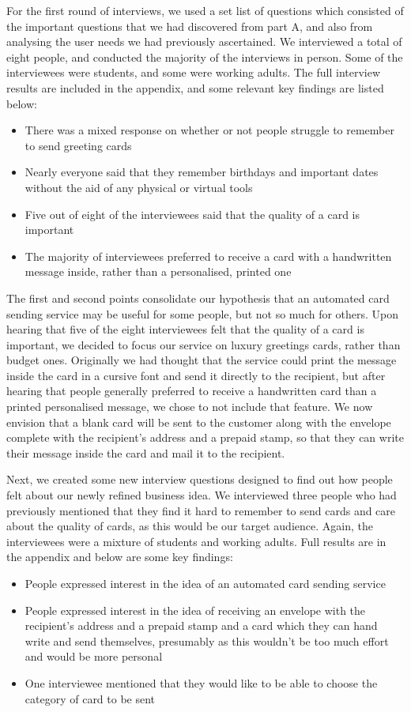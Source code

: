 \documentclass[10pt,a4paper]{article}
\begin{document}
For the first round of interviews, we used a set list of questions which consisted of the important questions that we had discovered from part A, and also from analysing the user needs we had previously ascertained. We interviewed a total of eight people, and conducted the majority of the interviews in person. Some of the interviewees were students, and some were working adults. The full interview results are included in the appendix, and some relevant key findings are listed below:
\begin{itemize}
  \item There was a mixed response on whether or not people struggle to remember to send greeting cards
  \item Nearly everyone said that they remember birthdays and important dates without the aid of any physical or virtual tools
  \item Five out of eight of the interviewees said that the quality of a card is important
  \item The majority of interviewees preferred to receive a card with a handwritten message inside, rather than a personalised, printed one
\end{itemize}
The first and second points consolidate our hypothesis that an automated card sending service may be useful for some people, but not so much for others. Upon hearing that five of the eight interviewees felt that the quality of a card is important, we decided to focus our service on luxury greetings cards, rather than budget ones. Originally we had thought that the service could print the message inside the card in a cursive font and send it directly to the recipient, but after hearing that people generally preferred to receive a handwritten card than a printed personalised message, we chose to not include that feature. We now envision that a blank card will be sent to the customer along with the envelope complete with the recipient's address and a prepaid stamp, so that they can write their message inside the card and mail it to the recipient.

Next, we created some new interview questions designed to find out how people felt about our newly refined business idea. We interviewed three people who had previously mentioned that they find it hard to remember to send cards and care about the quality of cards, as this would be our target audience. Again, the interviewees were a mixture of students and working adults. Full results are in the appendix and below are some key findings:
\begin{itemize}
  \item People expressed interest in the idea of an automated card sending service
  \item People expressed interest in the idea of receiving an envelope with the recipient's address and a prepaid stamp and a card which they can hand write and send themselves, presumably as this wouldn't be too much effort and would be more personal
  \item One interviewee mentioned that they would like to be able to choose the category of card to be sent
\end{itemize}
\end{document}
